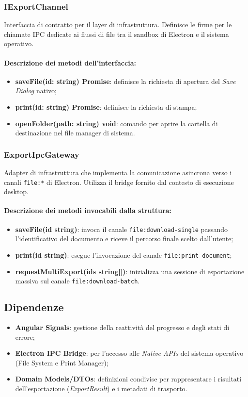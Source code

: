 \subsubsection{IExportChannel}
Interfaccia di contratto per il layer di infrastruttura. Definisce le firme per le chiamate IPC dedicate ai flussi di file tra il sandbox di Electron e il sistema operativo.

\paragraph{Descrizione dei metodi dell'interfaccia:}
\begin{itemize}
\item \textbf{saveFile(id: string) Promise}: definisce la richiesta di apertura del \textit{Save Dialog} nativo;
\item \textbf{print(id: string) Promise}: definisce la richiesta di stampa;
\item \textbf{openFolder(path: string) void}: comando per aprire la cartella di destinazione nel file manager di sistema.
\end{itemize}

\subsubsection{ExportIpcGateway}
Adapter di infrastruttura che implementa la comunicazione asincrona verso i canali \texttt{file:*} di Electron. Utilizza il bridge fornito dal contesto di esecuzione desktop.

\paragraph{Descrizione dei metodi invocabili dalla struttura:}
\begin{itemize}
\item \textbf{saveFile(id string)}: invoca il canale \texttt{file:download-single} passando l'identificativo del documento e riceve il percorso finale scelto dall'utente;
\item \textbf{print(id string)}: esegue l'invocazione del canale \texttt{file:print-document};
\item \textbf{requestMultiExport(ids string[])}: inizializza una sessione di esportazione massiva sul canale \texttt{file:download-batch}.
\end{itemize}

\subsection{Dipendenze}
\begin{itemize}
\item \textbf{Angular Signals}: gestione della reattività del progresso e degli stati di errore;
\item \textbf{Electron IPC Bridge}: per l'accesso alle \textit{Native APIs} del sistema operativo (File System e Print Manager);
\item \textbf{Domain Models/DTOs}: definizioni condivise per rappresentare i risultati dell'esportazione (\textit{ExportResult}) e i metadati di trasporto.
\end{itemize}

